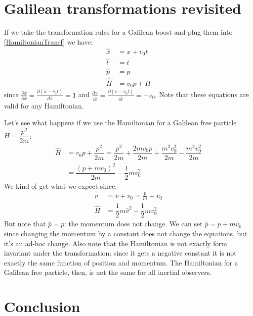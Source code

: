 \documentclass[aps,pra,10pt,floatfix,nofootinbib]{revtex4-1}
\theoremstyle{definition}
\begin{document}
\section{Galilean transformations revisited}
If we take the transformation rules for a Galilean boost and plug them into \eqref{HamiltonianTransf} we have:
\begin{equation}
\begin{aligned}
\hat{x} &= x + v_0 t \\
\hat{t} &= t \\
\hat{p} &= p \\
\hat{H} &= v_0 p + H
\end{aligned}
\label{galTransf}
\end{equation}
since $\frac{\partial x}{\partial \hat{x}} = \frac{\partial (\hat{x} - v_0 t)}{\partial \hat{x}} = 1$ and $\frac{\partial x}{\partial \hat{t}} = \frac{\partial (\hat{x} - v_0 t)}{\partial \hat{t}} = - v_0$. Note that these equations are valid for any Hamiltonian.

Let's see what happens if we use the Hamiltonian for a Galilean free particle $H=\dfrac{p^2}{2m}$:
\begin{equation}
\begin{aligned}
\hat{H} &= v_0 p + \dfrac{p^2}{2m} = \dfrac{p^2}{2m} + \dfrac{2mv_0 p}{2m} + \dfrac{m^2 v_0^2}{2m} - \dfrac{m^2 v_0^2}{2m} \\
&= \dfrac{(p+mv_0)^2}{2m} - \dfrac{1}{2} m v_0^2
\end{aligned}
\label{galTransf}
\end{equation}
We kind of get what we expect since:
\begin{equation}
\begin{aligned}
\hat{v} &= v + v_0 =  \frac{p}{m} + v_0 \\
\hat{H} &= \dfrac{1}{2} m \hat{v}^2 - \dfrac{1}{2} m v_0^2
\end{aligned}
\label{galTransf}
\end{equation}
But note that $\hat{p} = p$: the momentum does not change. We can set $\hat{p} = p + m v_0$ since changing the momentum by a constant does not change the equations, but it's an ad-hoc change. Also note that the Hamiltonian is not exactly form invariant under the transformation: since it gets a negative constant it is not exactly the same function of position and momentum. The Hamiltonian for a Galilean free particle, then, is not the same for all inertial observers.

\section{Conclusion}
\end{document}
